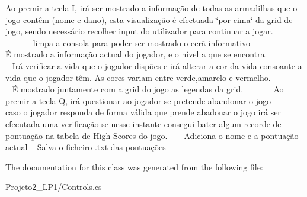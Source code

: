 Ao premir a tecla I, irá ser mostrado a informação de todas as armadilhas que o jogo contêm (nome e dano), esta visualização é efectuada \char`\"{}por cima\char`\"{} da grid de jogo, sendo necessário recolher input do utilizador para continuar a jogar. ~\newline
~\newline
~\newline
~\newline
~\newline
~\newline
~\newline
~\newline
 limpa a consola para poder ser mostrado o ecrã informativo ~\newline
~\newline
~\newline
~\newline
~\newline
~\newline
~\newline
 É mostrado a informação actual do jogador, e o nível a que se encontra. ~\newline
~\newline
~\newline
~\newline
~\newline
~\newline
 Irá verificar a vida que o jogador dispões e irá alterar a cor da vida consoante a vida que o jogador têm. As cores variam entre verde,amarelo e vermelho. ~\newline
~\newline
~\newline
~\newline
~\newline
 É mostrado juntamente com a grid do jogo as legendas da grid. ~\newline
~\newline
~\newline
~\newline
 Ao premir a tecla Q, irá questionar ao jogador se pretende abandonar o jogo ~\newline
~\newline
~\newline
 caso o jogador responda de forma válida que prende abadonar o jogo irá ser efecutada uma verificação se nesse instante consegui bater algum recorde de pontuação na tabela de High Scores do jogo. ~\newline
~\newline
 Adiciona o nome e a pontuação actual ~\newline
 Salva o ficheiro .txt das pontuações 

The documentation for this class was generated from the following file\+:\begin{DoxyCompactItemize}
\item 
Projeto2\+\_\+\+L\+P1/Controls.\+cs\end{DoxyCompactItemize}
